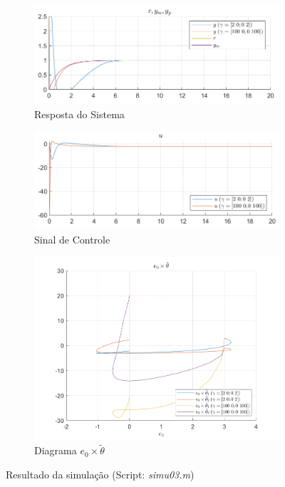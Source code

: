 \documentclass[10pt]{article}
\begin{document}
\begin{figure}[h!]
    \begin{subfigure}[b]{0.45\textwidth}
        \centering
        \includegraphics[width=\textwidth]{img/fig03c.png}
        \caption{Resposta do Sistema}
    \end{subfigure}
    \begin{subfigure}[b]{0.45\textwidth}
        \centering
        \includegraphics[width=\textwidth]{img/fig03e.png}
        \caption{Sinal de Controle}
    \end{subfigure}

    \vspace{0.5cm}

    \begin{subfigure}[b]{0.4\textwidth}
        \centering
        \includegraphics[width=\textwidth]{img/fig03d.png}
        \caption{Diagrama $e_0 \times \tilde{\theta}$}
    \end{subfigure}

    \caption{Resultado da simulação (Script: \textit{simu03.m})}
    \label{fig:sim3}
\end{figure}
\end{document}
